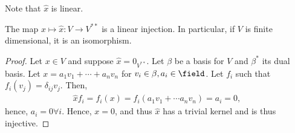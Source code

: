\begin{remark}
    Note that $\hat{x}$ is linear.
\end{remark}

\begin{theorem}
    The map $x \mapsto \hat{x} : V \to V^{\ast \ast}$ is a linear injection. In particular, if $V$ is finite dimensional, it is an isomorphism.
\end{theorem}

\begin{proof}
    Let $x \in V$ and suppose $\hat{x} = 0_{V^{\ast \ast}}$. Let $\beta$ be a basis for $V$ and $\beta^\ast$ its dual basis. Let $x = a_1 v_1 + \cdots + a_n v_n$ for $v_i \in \beta, a_i \in \field$. Let $f_i$ such that $f_i(v_j) = \delta_{ij} v_j$. Then, \begin{align*}
        \hat{x}f_i = f_i (x) = f_i(a_1 v_1 + \cdots a_n v_n) = a_i = 0,
    \end{align*}
    hence, $a_i = 0 \forall i$. Hence, $x = 0$, and thus $\hat{x}$ has a trivial kernel and is thus injective.
\end{proof}

